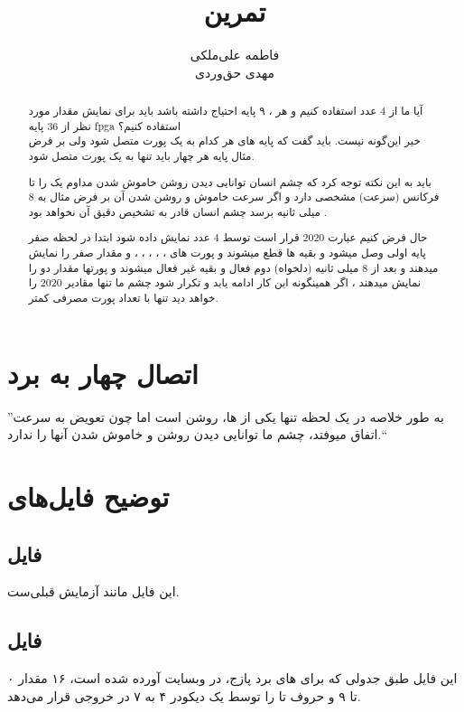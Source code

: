 \documentclass[dvipsnames, svgnames, x11names, a4paper, 11pt]{article}
\title{تمرین \lr{7-Segement}}
\author{
فاطمه علی‌ملکی \\
مهدی حق‌وردی
}
\begin{document}
\maketitle
\tableofcontents
\newpage
\section{اتصال چهار  به برد }
\begin{abstract}
آیا ما از 4 عدد  استفاده کنیم و هر ، ۹ پایه احتیاج داشته باشد باید برای نمایش مقدار مورد نظر از 36 پایه fpga استفاده کنیم؟ \\

خیر این‌گونه نیست. باید گفت که پایه های
هر کدام به یک پورت متصل شود ولی بر فرض مثال پایه  هر چهار  باید تنها به یک پورت متصل شود.

باید به این نکته توجه کرد که چشم انسان توانایی دیدن روشن خاموش شدن مداوم یک  را تا فرکانس (سرعت) مشخصی دارد و اگر سرعت خاموش و روشن شدن آن بر فرض مثال به 8 میلی ثانیه برسد چشم انسان  قادر به تشخیص دقیق آن نخواهد بود .

حال فرض کنیم عبارت 2020 قرار است توسط 4 عدد  نمایش داده شود ابتدا در لحظه صفر پایه  اولی وصل میشود  و بقیه  ها قطع میشوند و پورت های 
،
،
،
، 
،
 و
مقدار صفر را نمایش میدهند و بعد از 8 میلی ثانیه (دلخواه)  دوم فعال و بقیه غیر فعال میشوند و پورتها مقدار دو را نمایش میدهند ، اگر همینگونه این کار ادامه یابد و تکرار شود چشم ما تنها مقادیر 2020 را خواهد دید تنها با تعداد پورت مصرفی کمتر.
\end{abstract}\label{abstract}
''به طور خلاصه در یک لحظه تنها یکی از ها، روشن است اما چون تعویض به سرعت اتفاق میوفتد، چشم ما توانایی دیدن روشن و خاموش شدن آنها را ندارد.``

\section{توضیح فایل‌های }
\subsection{فایل }\label{sec:cd}
این فایل مانند 
آزمایش قبلی‌ست.

\subsection{فایل }\label{sec:dss}
این فایل طبق جدولی که برای 
های
برد پازج، در وبسایت
آورده شده‌ است، ۱۶ مقدار ۰ تا ۹ و حروف
تا 
را توسط یک دیکودر ۴ به ۷ در خروجی قرار می‌دهد.
\end{document}
